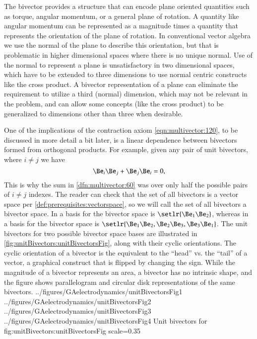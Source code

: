 The bivector provides a structure that can encode plane oriented quantities such as torque, angular momentum, or a general plane of rotation.
A quantity like angular momentum can be represented as a magnitude times a quantity that represents the orientation of the plane of rotation.
In conventional vector algebra we use the normal of the plane to describe this orientation, but that is problematic in higher dimensional spaces where there is no unique normal.
Use of the normal to represent a plane is unsatisfactory in two dimensional spaces, which have to be extended to three dimensions to use normal centric constructs like the cross product.
A bivector representation of a plane can eliminate the requirement to utilize a third (normal) dimension, which may not be relevant in the problem, and can allow some concepts (like the cross product) to be generalized to dimensions other than three when desirable.

One of the implications of the contraction axiom \cref{eqn:multivector:120}, to be discussed in more detail a bit later, is a linear dependence between bivectors formed from orthogonal products.  For example, given any pair of unit bivectors, where \( i \ne j \) we have
\begin{dmath}\label{eqn:multivector:140}
\Be_i \Be_j + \Be_j \Be_i = 0,
\end{dmath}
This is why the sum in \cref{dfn:multivector:60} was over only half the possible pairs of \( i \ne j \) indexes.
The reader can check that the set of all bivectors is a vector space per
\cref{def:prerequisites:vectorspace}, so we will call the set of all bivectors a bivector space.
In  a basis for the bivector space is \( \setlr{ \Be_1 \Be_2 } \), whereas in  a basis for the bivector space is
\( \setlr{ \Be_1 \Be_2, \Be_2 \Be_3, \Be_3 \Be_1 } \).  The unit bivectors for two possible  bivector space bases are illustrated in
\cref{fig:unitBivectors:unitBivectorsFig}, along with their cyclic orientations.  The cyclic orientation of a bivector is the equivalent to the ``head'' vs. the ``tail'' of a vector, a graphical construct that is flipped by changing the sign.  While the magnitude of a bivector represents an area, a bivector has no intrinsic shape, and the figure shows parallelogram and circular disk representations of the same bivectors.
\imageFourFiguresTwoLines
{../figures/GAelectrodynamics/unitBivectorsFig1}
{../figures/GAelectrodynamics/unitBivectorsFig2}
{../figures/GAelectrodynamics/unitBivectorsFig3}
{../figures/GAelectrodynamics/unitBivectorsFig4}
{Unit bivectors for }
{fig:unitBivectors:unitBivectorsFig}
{scale=0.35}

